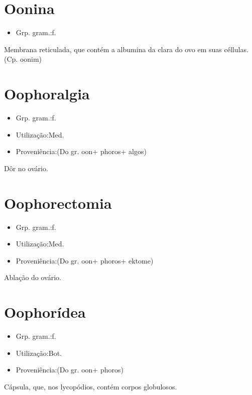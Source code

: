 \section{Oonina}
\begin{itemize}
\item {Grp. gram.:f.}
\end{itemize}
Membrana reticulada, que contém a albumina da clara do ovo em suas céllulas.
(Cp. \textunderscore oonim\textunderscore )
\section{Oophoralgia}
\begin{itemize}
\item {Grp. gram.:f.}
\end{itemize}
\begin{itemize}
\item {Utilização:Med.}
\end{itemize}
\begin{itemize}
\item {Proveniência:(Do gr. \textunderscore oon\textunderscore  + \textunderscore phoros\textunderscore  + \textunderscore algos\textunderscore )}
\end{itemize}
Dôr no ovário.
\section{Oophorectomia}
\begin{itemize}
\item {Grp. gram.:f.}
\end{itemize}
\begin{itemize}
\item {Utilização:Med.}
\end{itemize}
\begin{itemize}
\item {Proveniência:(Do gr. \textunderscore oon\textunderscore  + \textunderscore phoros\textunderscore  + \textunderscore ektome\textunderscore )}
\end{itemize}
Ablação do ovário.
\section{Oophorídea}
\begin{itemize}
\item {Grp. gram.:f.}
\end{itemize}
\begin{itemize}
\item {Utilização:Bot.}
\end{itemize}
\begin{itemize}
\item {Proveniência:(Do gr. \textunderscore oon\textunderscore  + \textunderscore phoros\textunderscore )}
\end{itemize}
Cápsula, que, nos lycopódios, contém corpos globulosos.
